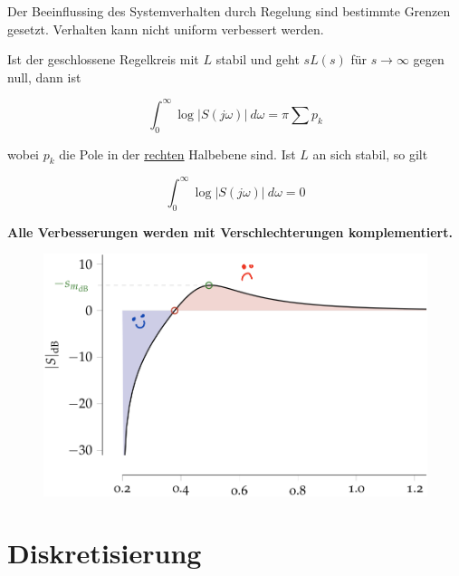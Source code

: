\documentclass[
  10pt,
  a4paper,
  twocolumn]{article}
\numberwithin{equation}{section}
\begin{document}
Der Beeinflussing des Systemverhalten durch Regelung sind bestimmte
Grenzen gesetzt. Verhalten kann nicht uniform verbessert werden.

\begin{tcolorbox}[enhanced jigsaw, bottomtitle=1mm, title=\textcolor{quarto-callout-note-color}{\faInfo}\hspace{0.5em}{Bode's Integral}, arc=.35mm, rightrule=.15mm, toprule=.15mm, opacitybacktitle=0.6, coltitle=black, bottomrule=.15mm, toptitle=1mm, colframe=quarto-callout-note-color-frame, colbacktitle=quarto-callout-note-color!10!white, breakable, titlerule=0mm, leftrule=.75mm, left=2mm, opacityback=0, colback=white]

Ist der geschlossene Regelkreis mit \(L\) stabil und geht \(sL(s)\) für
\(s\rightarrow\infty\) gegen null, dann ist

\[
\int_0^\infty \log\lvert S(j\omega)\rvert\ d\omega = \pi \sum p_k
\]

wobei \(p_k\) die Pole in der \ul{rechten} Halbebene sind. Ist \(L\) an
sich stabil, so gilt

\[
\int_0^\infty\log\lvert S(j\omega)\rvert\ d\omega = 0
\]

\end{tcolorbox}

\textbf{Alle Verbesserungen werden mit Verschlechterungen
komplementiert.}

\begin{figure}[H]

{\centering \includegraphics{images/paste-42.png}

}

\end{figure}

\hypertarget{diskretisierung}{%
\section{Diskretisierung}\label{diskretisierung}}
\end{document}
